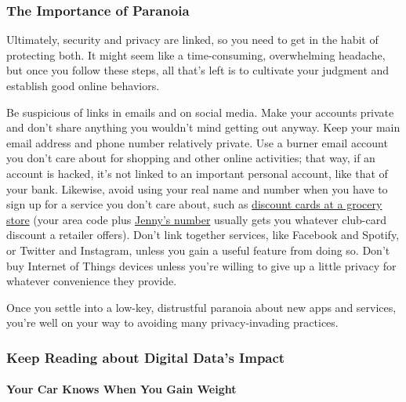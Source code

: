 \hypertarget{the-importance-of-paranoia}{%
\subsubsection{The Importance of
Paranoia}\label{the-importance-of-paranoia}}

Ultimately, security and privacy are linked, so you need to get in the
habit of protecting both. It might seem like a time-consuming,
overwhelming headache, but once you follow these steps, all that's left
is to cultivate your judgment and establish good online behaviors.

Be suspicious of links in emails and on social media. Make your accounts
private and don't share anything you wouldn't mind getting out anyway.
Keep your main email address and phone number relatively private. Use a
burner email account you don't care about for shopping and other online
activities; that way, if an account is hacked, it's not linked to an
important personal account, like that of your bank. Likewise, avoid
using your real name and number when you have to sign up for a service
you don't care about, such as
\href{https://www.nytimes3xbfgragh.onion/2013/03/26/technology/facebook-expands-targeted-advertising-through-outside-data-sources.html}{discount
cards at a grocery store} (your area code plus
\href{https://en.wikipedia.org/wiki/867-5309/Jenny}{Jenny's number}
usually gets you whatever club-card discount a retailer offers). Don't
link together services, like Facebook and Spotify, or Twitter and
Instagram, unless you gain a useful feature from doing so. Don't buy
Internet of Things devices unless you're willing to give up a little
privacy for whatever convenience they provide.~

Once you settle into a low-key, distrustful paranoia about new apps and
services, you're well on your way to avoiding many privacy-invading
practices.

\hypertarget{keep-reading-about-digital-datas-impact}{%
\subsubsection{Keep Reading about Digital Data's
Impact}\label{keep-reading-about-digital-datas-impact}}

\href{https://www.nytimes3xbfgragh.onion/2019/05/20/opinion/car-repair-data-privacy.html}{}

\hypertarget{your-car-knows-when-you-gain-weight}{%
\paragraph{Your Car Knows When You Gain
Weight}\label{your-car-knows-when-you-gain-weight}}

